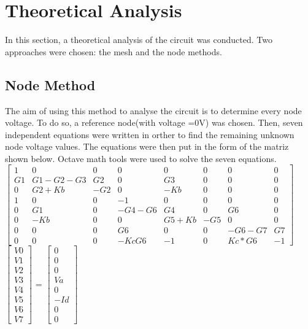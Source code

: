 

\section {Theoretical Analysis}
\label{analysis}

In this section, a theoretical analysis of the circuit was conducted. Two approaches were chosen: the mesh and the node methods.

\subsection{Node Method}

The aim of using this method to analyse the circuit is to determine every node voltage. To do so, a reference node(with voltage =0V) was chosen. Then, seven independent equations were written in orther to find the remaining unknown node voltage values. The equations were then put in the form of the matriz shown below. Octave math tools were used to solve the seven equations.\\

$\begin{bmatrix}
1 & 0 & 0 & 0 & 0 & 0 & 0 & 0\\
G1 & G1-G2-G3 & G2 & 0 & G3 & 0 & 0 & 0\\
0 & G2+Kb & -G2 & 0 & -Kb & 0 & 0 & 0\\
1 & 0 & 0 & -1 & 0 & 0 & 0 & 0\\
0 & G1 & 0 & -G4-G6 & G4 & 0 & G6 & 0\\
0 & -Kb & 0 & 0 & G5+Kb & -G5 & 0 & 0\\
0 & 0 & 0 & G6 & 0 & 0 & -G6-G7 & G7\\
0 & 0 & 0 & -KcG6 & -1 & 0 & Kc*G6 & -1
\end{bmatrix}$
$\begin{bmatrix}
V0 \\ V1 \\ V2 \\ V3 \\ V4 \\ V5 \\ V6 \\ V7
\end{bmatrix}$
= 
$\begin{bmatrix}
0 \\ 0 \\ 0 \\ Va \\ 0 \\ -Id \\ 0 \\ 0
\end{bmatrix}$

